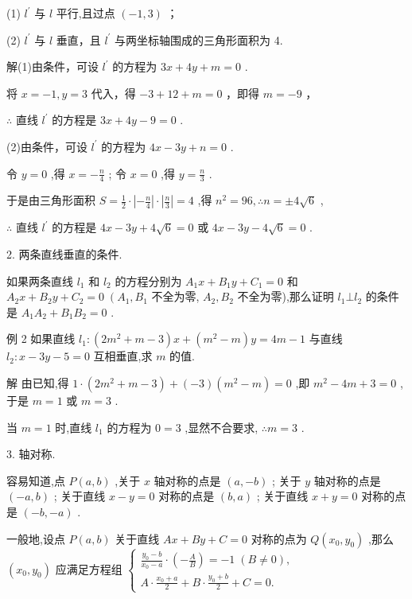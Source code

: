 \documentclass[10pt]{article}
\begin{document}
(1) \({l}^{\prime }\) 与 \(l\) 平行,且过点 \(\left( {-1,3}\right)\) ；

(2) \({l}^{\prime }\) 与 \(l\) 垂直，且 \({l}^{\prime }\) 与两坐标轴围成的三角形面积为 4.

解(1)由条件，可设 \({l}^{\prime }\) 的方程为 \({3x} + {4y} + m = 0\) .

将 \(x =  - 1,y = 3\) 代入，得 \(- 3 + {12} + m = 0\) ，即得 \(m =  - 9\) ，

\(\therefore\) 直线 \({l}^{\prime }\) 的方程是 \({3x} + {4y} - 9 = 0\) .

(2)由条件，可设 \({l}^{\prime }\) 的方程为 \({4x} - {3y} + n = 0\) .

令 \(y = 0\) ,得 \(x =  - \frac{n}{4}\) ; 令 \(x = 0\) ,得 \(y = \frac{n}{3}\) .

于是由三角形面积 \(S = \frac{1}{2} \cdot  \left| {-\frac{n}{4}}\right|  \cdot  \left| \frac{n}{3}\right|  = 4\) ,得 \({n}^{2} = {96},\therefore n =  \pm  4\sqrt{6}\) ,

\(\therefore\) 直线 \({l}^{\prime }\) 的方程是 \({4x} - {3y} + 4\sqrt{6} = 0\) 或 \({4x} - {3y} - 4\sqrt{6} = 0\) .

2. 两条直线垂直的条件.

如果两条直线 \({l}_{1}\) 和 \({l}_{2}\) 的方程分别为 \({A}_{1}x + {B}_{1}y + {C}_{1} = 0\) 和 \({A}_{2}x + {B}_{2}y + {C}_{2} = 0\;\left( {{A}_{1},{B}_{1}}\right.\) 不全为零, \({A}_{2},{B}_{2}\) 不全为零),那么证明 \({l}_{1} \bot  {l}_{2}\) 的条件是 \({A}_{1}{A}_{2} + {B}_{1}{B}_{2} = 0\) .

例 2 如果直线 \({l}_{1} : \left( {2{m}^{2} + m - 3}\right) x + \left( {{m}^{2} - m}\right) y = {4m} - 1\) 与直线 \({l}_{2} : x - {3y} - 5 = 0\) 互相垂直,求 \(m\) 的值.

解 由已知,得 \(1 \cdot  \left( {2{m}^{2} + m - 3}\right)  + \left( {-3}\right) \left( {{m}^{2} - m}\right)  = 0\) ,即 \({m}^{2} - {4m} + 3 = 0\) ,于是 \(m = 1\) 或 \(m = 3\) .

当 \(m = 1\) 时,直线 \({l}_{1}\) 的方程为 \(0 = 3\) ,显然不合要求, \(\therefore m = 3\) .

3. 轴对称.

容易知道,点 \(P\left( {a,b}\right)\) ,关于 \(x\) 轴对称的点是 \(\left( {a, - b}\right)\) ; 关于 \(y\) 轴对称的点是 \(\left( {-a,b}\right)\) ; 关于直线 \(x - y = 0\) 对称的点是 \(\left( {b,a}\right)\) ; 关于直线 \(x + y = 0\) 对称的点是 \(\left( {-b, - a}\right)\) .

一般地,设点 \(P\left( {a,b}\right)\) 关于直线 \({Ax} + {By} + C = 0\) 对称的点为 \(Q\left( {{x}_{0},{y}_{0}}\right)\) ,那么 \(\left( {{x}_{0},{y}_{0}}\right)\) 应满足方程组 \(\left\{  \begin{array}{l} \frac{{y}_{0} - b}{{x}_{0} - a} \cdot  \left( {-\frac{A}{B}}\right)  =  - 1\;\left( {B \neq  0}\right) , \\  A \cdot  \frac{{x}_{0} + a}{2} + B \cdot  \frac{{y}_{0} + b}{2} + C = 0. \end{array}\right.\)
\end{document}
